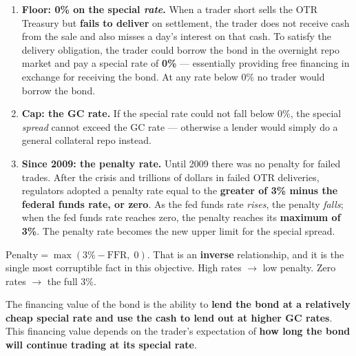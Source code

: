 \begin{lrkeybox}
\begin{enumerate}
\item \textbf{Floor: 0\% on the special \emph{rate}.} When a trader short sells the OTR Treasury but \textbf{fails to deliver} on settlement, the trader does not receive cash from the sale and also misses a day's interest on that cash. To satisfy the delivery obligation, the trader could borrow the bond in the overnight repo market and pay a special rate of \textbf{0\%} --- essentially providing free financing in exchange for receiving the bond. At any rate below 0\% no trader would borrow the bond.
\item \textbf{Cap: the GC rate.} If the special rate could not fall below 0\%, the special \emph{spread} cannot exceed the GC rate --- otherwise a lender would simply do a general collateral repo instead.
\item \textbf{Since 2009: the penalty rate.} Until 2009 there was no penalty for failed trades. After the crisis and trillions of dollars in failed OTR deliveries, regulators adopted a penalty rate equal to the \textbf{greater of 3\% minus the federal funds rate, or zero}. As the fed funds rate \emph{rises}, the penalty \emph{falls}; when the fed funds rate reaches zero, the penalty reaches its \textbf{maximum of 3\%}. The penalty rate becomes the new upper limit for the special spread.
\end{enumerate}
\end{lrkeybox}

\begin{lrtrapbox}
$\text{Penalty} = \max(3\% - \text{FFR},\; 0)$. That is an \textbf{inverse} relationship, and it is the single most corruptible fact in this objective. High rates $\rightarrow$ low penalty. Zero rates $\rightarrow$ the full 3\%.
\end{lrtrapbox}


\begin{lrkeybox}
The financing value of the bond is the ability to \textbf{lend the bond at a relatively cheap special rate and use the cash to lend out at higher GC rates}. This financing value depends on the trader's expectation of \textbf{how long the bond will continue trading at its special rate}.
\end{lrkeybox}

